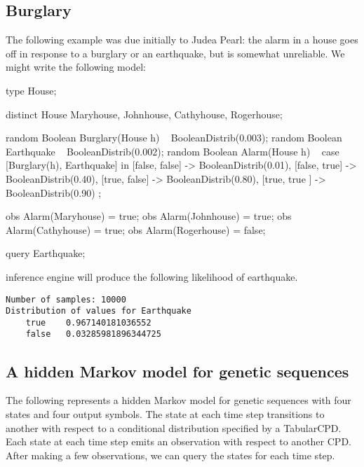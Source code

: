 \documentclass[12pt]{article}
\begin{document}
\subsection{Burglary}
The following example was due initially to Judea Pearl:
the alarm in a house goes off in response to a burglary or an earthquake,
but is somewhat unreliable. We might write the following model:
\begin{blogcode}
type House;

distinct House Maryhouse, Johnhouse, Cathyhouse, Rogerhouse;

random Boolean Burglary(House h) ~ BooleanDistrib(0.003);
random Boolean Earthquake ~ BooleanDistrib(0.002);
random Boolean Alarm(House h) ~ 
  case [Burglary(h), Earthquake] in {
    [false, false] -> BooleanDistrib(0.01),
    [false, true]  -> BooleanDistrib(0.40),
    [true, false]  -> BooleanDistrib(0.80),
    [true, true ]  -> BooleanDistrib(0.90)
  };

obs Alarm(Maryhouse) = true;
obs Alarm(Johnhouse) = true;
obs Alarm(Cathyhouse) = true;
obs Alarm(Rogerhouse) = false;

query Earthquake;
\end{blogcode}

\bl inference engine will produce the following likelihood of earthquake.
\begin{verbatim}
Number of samples: 10000
Distribution of values for Earthquake
	true	0.967140181036552
	false	0.03285981896344725
\end{verbatim}


\subsection{A hidden Markov model for genetic sequences}
\begin{example}
The following represents a hidden Markov model for genetic sequences with four states and four output symbols. The state at each time step transitions to another with respect to a conditional distribution specified by a TabularCPD. 
Each state at each time step emits an observation with respect to another CPD. After making a few observations, we can query the states for each time step.
\end{example}
\end{document}
